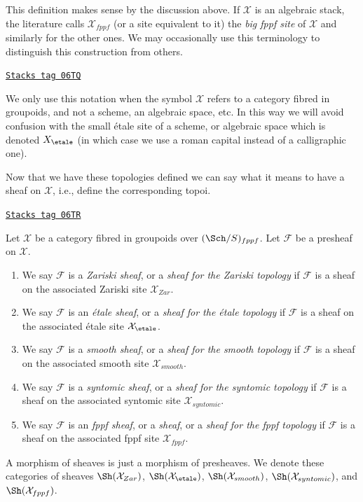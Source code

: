 This definition makes sense by the discussion above. If $\mathcal{X}$
is an algebraic stack, the literature calls $\mathcal{X}_{fppf}$ (or a
site equivalent to it) the {\it big fppf site} of $\mathcal{X}$ and similarly
for the other ones. We may occasionally use this terminology to
distinguish this construction from others.

\begin{remark}[Ambiguity]
\label{stacks-sheaves-remark-ambiguity}
\href{https://stacks.math.columbia.edu/tag/06TQ}{\texttt{Stacks tag 06TQ}}

We only use this notation when the symbol $\mathcal{X}$ refers to a
category fibred in groupoids, and not a scheme, an algebraic space, etc.
In this way we will avoid confusion with the small \'etale site of a
scheme, or algebraic space which is denoted $X_\etale$ (in which
case we use a roman capital instead of a calligraphic one).
\end{remark}

Now that we have these topologies defined we can say what it means
to have a sheaf on $\mathcal{X}$, i.e., define the corresponding topoi.

\begin{definition}[Sheaves]
\label{stacks-sheaves-definition-sheaves}
\href{https://stacks.math.columbia.edu/tag/06TR}{\texttt{Stacks tag 06TR}}

Let $\mathcal{X}$ be a category fibred in groupoids over
$(\Sch/S)_{fppf}$. Let $\mathcal{F}$ be a presheaf on $\mathcal{X}$.
\begin{enumerate}
\item We say $\mathcal{F}$ is a {\it Zariski sheaf}, or a
{\it sheaf for the Zariski topology} if $\mathcal{F}$
is a sheaf on the associated Zariski site $\mathcal{X}_{Zar}$.
\item We say $\mathcal{F}$ is an {\it \'etale sheaf}, or a
{\it sheaf for the \'etale topology} if $\mathcal{F}$
is a sheaf on the associated \'etale site $\mathcal{X}_\etale$.
\item We say $\mathcal{F}$ is a {\it smooth sheaf}, or a
{\it sheaf for the smooth topology} if $\mathcal{F}$
is a sheaf on the associated smooth site $\mathcal{X}_{smooth}$.
\item We say $\mathcal{F}$ is a {\it syntomic sheaf}, or a
{\it sheaf for the syntomic topology} if $\mathcal{F}$
is a sheaf on the associated syntomic site $\mathcal{X}_{syntomic}$.
\item We say $\mathcal{F}$ is an {\it fppf sheaf}, or a {\it sheaf},
or a {\it sheaf for the fppf topology} if $\mathcal{F}$
is a sheaf on the associated fppf site $\mathcal{X}_{fppf}$.
\end{enumerate}
A morphism of sheaves is just a morphism of presheaves. We denote
these categories of sheaves
$\Sh(\mathcal{X}_{Zar})$,
$\Sh(\mathcal{X}_\etale)$,
$\Sh(\mathcal{X}_{smooth})$,
$\Sh(\mathcal{X}_{syntomic})$, and
$\Sh(\mathcal{X}_{fppf})$.
\end{definition}

